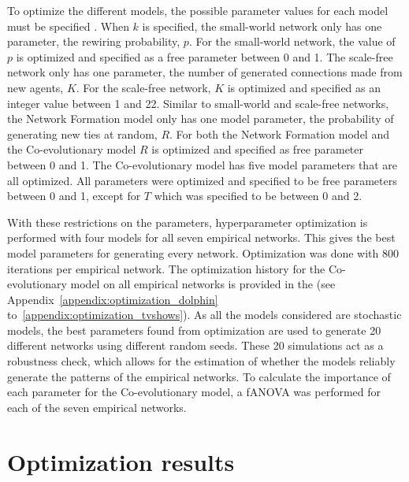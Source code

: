 \documentclass[11pt]{article}
\begin{document}
\noindent To optimize the different models, the possible parameter values for each model must be specified \cite{akiba_optuna_2019}. When $k$ is specified, the small-world network only has one parameter, the rewiring probability, $p$. For the small-world network, the value of $p$ is optimized and specified as a free parameter between 0 and 1. The scale-free network only has one parameter, the number of generated connections made from new agents, $K$. For the scale-free network, $K$ is optimized and specified as an integer value between 1 and 22. Similar to small-world and scale-free networks, the Network Formation model only has one model parameter, the probability of generating new ties at random, $R$. For both the Network Formation model and the Co-evolutionary model $R$ is optimized and specified as free parameter between 0 and 1. The Co-evolutionary model has five model parameters that are all optimized. All parameters were optimized and specified to be free parameters between 0 and 1, except for $T$ which was specified to be between 0 and 2.

\noindent With these restrictions on the parameters, hyperparameter optimization is performed with four models for all seven empirical networks. This gives the best model parameters for generating every network. Optimization was done with 800 iterations per empirical network. The optimization history for the Co-evolutionary model on all empirical networks is provided in the \textit{} (see Appendix~\ref{appendix:optimization_dolphin} to~\ref{appendix:optimization_tvshows}). As all the models considered are stochastic models, the best parameters found from optimization are used to generate 20 different networks using different random seeds. These 20 simulations act as a robustness check, which allows for the estimation of whether the models reliably generate the patterns of the empirical networks. To calculate the importance of each parameter for the Co-evolutionary model, a fANOVA was performed for each of the seven empirical networks.

\section{Optimization results}
\end{document}
